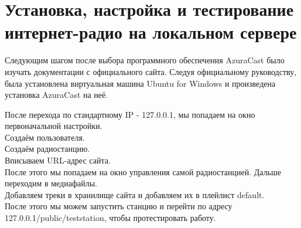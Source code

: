 \section{Установка, настройка и тестирование интернет-радио на локальном сервере}

Следующим шагом после выбора программного обеспечения AzuraCast было изучать документации с официального сайта. Следуя официальному руководству, была установлена виртуальная машина Ubuntu for Windows и произведена установка AzuraCast на неё.

После перехода по стандартному IP - 127.0.0.1, мы попадаем на окно первоначальной настройки. \\
Создаём пользователя. \\
Создаём радиостанцию. \\
Вписываем URL-адрес сайта. \\
После этого мы попадаем на окно управления самой радиостанцией. Дальше переходим в медиафайлы. \\
Добавляем треки в хранилище сайта и добавляем их в плейлист default. \\
После этого мы можем запустить станцию и перейти по адресу 127.0.0.1/public/teststation, чтобы протестировать работу.